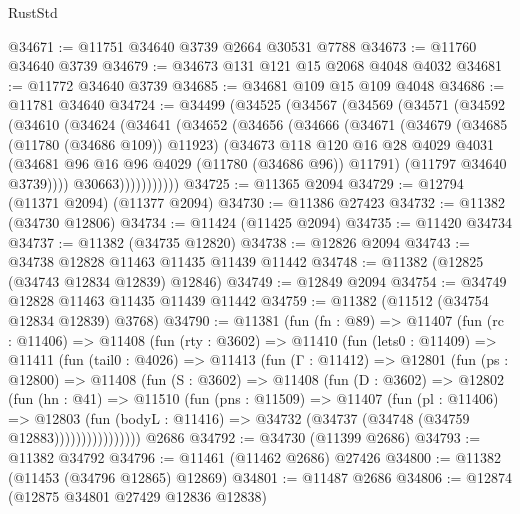 \begin{lexlean}{RustStd}
\begin{coremodule}
@34671 := @11751 @34640 @3739 @2664 @30531 @7788
@34673 := @11760 @34640 @3739
@34679 := @34673 @131 @121 @15 @2068 @4048 @4032
@34681 := @11772 @34640 @3739
@34685 := @34681 @109 @15 @109 @4048
@34686 := @11781 @34640
@34724 := @34499
    (@34525
      (@34567
        (@34569
          (@34571
            (@34592
              (@34610
                (@34624
                  (@34641
                    (@34652
                      (@34656
                        (@34666
                          (@34671
                            (@34679
                              (@34685 (@11780 (@34686 @109)) @11923)
                              (@34673
                                @118
                                @120
                                @16
                                @28
                                @4029
                                @4031
                                (@34681 @96 @16 @96 @4029 (@11780 (@34686 @96)) @11791)
                                (@11797 @34640 @3739))))
                          @30663)))))))))))
@34725 := @11365 @2094
@34729 := @12794 (@11371 @2094) (@11377 @2094)
@34730 := @11386 @27423
@34732 := @11382 (@34730 @12806)
@34734 := @11424 (@11425 @2094)
@34735 := @11420 @34734
@34737 := @11382 (@34735 @12820)
@34738 := @12826 @2094
@34743 := @34738 @12828 @11463 @11435 @11439 @11442
@34748 := @11382 (@12825 (@34743 @12834 @12839) @12846)
@34749 := @12849 @2094
@34754 := @34749 @12828 @11463 @11435 @11439 @11442
@34759 := @11382 (@11512 (@34754 @12834 @12839) @3768)
@34790 := @11381
    (fun (fn : @89) =>
    @11407
      (fun (rc : @11406) =>
      @11408
        (fun (rty : @3602) =>
        @11410
          (fun (lets0 : @11409) =>
          @11411
            (fun (tail0 : @4026) =>
            @11413
              (fun (Γ : @11412) =>
              @12801
                (fun (ps : @12800) =>
                @11408
                  (fun (S : @3602) =>
                  @11408
                    (fun (D : @3602) =>
                    @12802
                      (fun (hn : @41) =>
                      @11510
                        (fun (pns : @11509) =>
                        @11407
                          (fun (pl : @11406) =>
                          @12803
                            (fun (bodyL : @11416) =>
                            @34732 (@34737 (@34748 (@34759 @12883))))))))))))))))
    @2686
@34792 := @34730 (@11399 @2686)
@34793 := @11382 @34792
@34796 := @11461 (@11462 @2686) @27426
@34800 := @11382 (@11453 (@34796 @12865) @12869)
@34801 := @11487 @2686
@34806 := @12874 (@12875 @34801 @27429 @12836 @12838)

\end{coremodule}
\end{lexlean}
